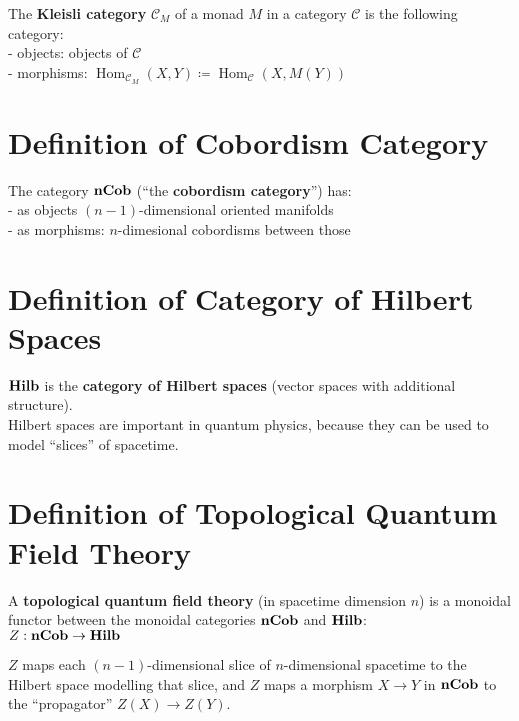 \documentclass[a4paper, twoside, english, 11pt]{book}
\DeclareMathOperator{\Hom}{Hom}
\newcommand{\C}{\mathcal C}
\newcommand{\catname}[1]{{\normalfont\textbf{#1}}}
\newcommand{\nCob}{\catname{nCob}}
\newcommand{\Hilb}{\catname{Hilb}}
\begin{document}
The \textbf{Kleisli category} $\C_M$ of a monad $M$ in a category $\C$ is the following category: \\

- objects: objects of $\C$ \\

- morphisms: $\Hom_{\C_M}(X, Y) \coloneqq \Hom_\C(X, M(Y))$



\section{Definition of Cobordism Category}

The category $\nCob$ (``the \textbf{cobordism category}'') has: \\

- as objects $(n - 1)$-dimensional oriented manifolds \\

- as morphisms: $n$-dimesional cobordisms between those



\section{Definition of Category of Hilbert Spaces}

$\Hilb$ is the \textbf{category of Hilbert spaces} (vector spaces with additional structure). \\

\noindent
Hilbert spaces are important in quantum physics, because they can be used to model ``slices'' of spacetime.



\section{Definition of Topological Quantum Field Theory}

A \textbf{topological quantum field theory} (in spacetime dimension $n$) is a monoidal functor between the monoidal categories $\nCob$ and $\Hilb$: \\

$Z : \nCob \rightarrow \Hilb$ \\

\noindent

$Z$ maps each $(n - 1)$-dimensional slice of $n$-dimensional spacetime to the Hilbert space modelling that slice, and $Z$ maps a morphism $X \rightarrow Y$ in $\nCob$ to the ``propagator'' $Z(X) \rightarrow Z(Y)$.
\end{document}
